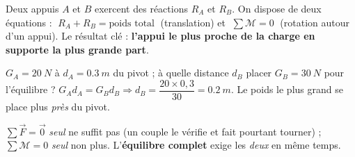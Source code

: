 \documentclass[11pt,a4paper]{article}
\newcommand{\vv}[1]{\vec{#1}}\newcommand{\ds}{\displaystyle}
\begin{document}
\begin{cle}
Deux appuis $A$ et $B$ exercent des réactions $R_A$ et $R_B$. On dispose de deux équations :
$\;R_A+R_B = \text{poids total}\;$ (translation) et $\;\sum\mathcal{M}=0\;$ (rotation autour d'un
appui). Le résultat clé : \textbf{l'appui le plus proche de la charge en supporte la plus grande part}.
\end{cle}

\begin{exemplebox}
$G_A=\qty{20}{N}$ à $d_A=\qty{0.3}{m}$ du pivot ; à quelle distance $d_B$ placer $G_B=\qty{30}{N}$
pour l'équilibre ? $G_A d_A = G_B d_B \Rightarrow d_B = \dfrac{20\times 0{,}3}{30}=\qty{0.2}{m}$. Le
poids le plus grand se place plus \emph{près} du pivot.
\end{exemplebox}

\begin{piege}
$\sum\vv F=\vv 0$ \emph{seul} ne suffit pas (un couple le vérifie et fait pourtant tourner) ;
$\sum\mathcal{M}=0$ \emph{seul} non plus. L'\textbf{équilibre complet} exige les \emph{deux} en même temps.
\end{piege}
\end{document}
